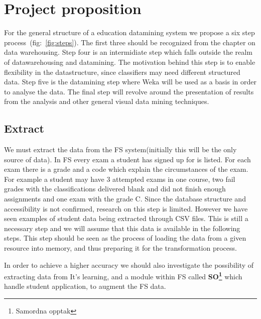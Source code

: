 \chapter{Project proposition}
	For the general structure of a education datamining system we propose 
	a six step process~(fig:~\ref{fig:steps}). 
	The first three should be recognized from the chapter on data warehousing. 
	Step four is an intermidiate step which falls outside the realm of datawarehousing and datamining. 
	The motivation behind this step is to enable flexibility in the datastructure, since classifiers may need different structured data.
	Step five is the datamining step where Weka will be used as a basis
	in order to analyse the data. 
	The final step will revolve around the presentation of results from the analysis and other general visual data mining techniques. 
	

%
\section{Extract}
We must extract the data from the FS system(initially this will be the only source of data).
In FS every exam a student has signed up for is listed.
For each exam there is a grade and a code which explain the circumstances of the exam.
For example a student may have 3 attempted exams in one course, two fail grades with the classifications delivered blank and did not finish enough assignments and one exam with the grade C.
Since the database structure and accessibility is not confirmed, research on this step is limited.
However we have seen examples of student data being extracted through CSV files. 
This is still a necessary step and we will assume that this data is available in the following steps. This step should be seen as the process of loading the data from a given resource into memory, and thus preparing it for the transformation process.

\bigskip\noindent
In order to achieve a higher accuracy we should also investigate 
the possibility of extracting data from It's learning, and a module within FS called \textbf{SO\footnote{Samordna opptak}} which handle student application, to augment the FS data.

